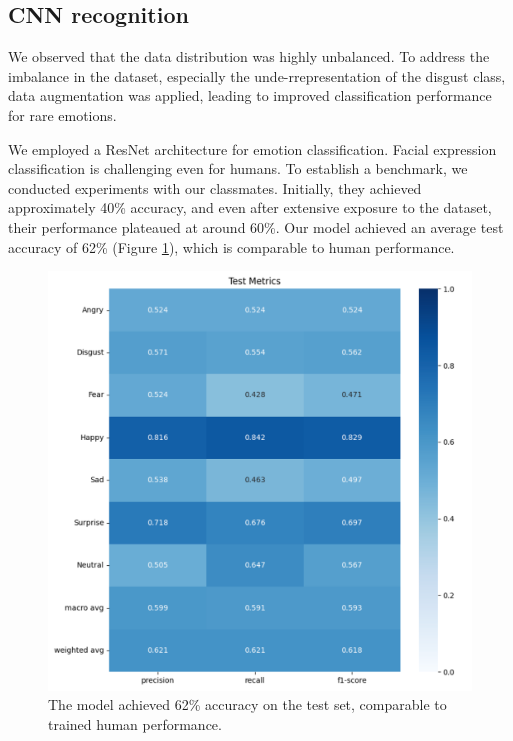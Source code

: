 \subsection{CNN recognition}
We observed that the data distribution was highly unbalanced. To address the imbalance in the dataset, especially the unde-rrepresentation of the disgust class, data augmentation was applied, leading to improved classification performance for rare emotions.

We employed a ResNet architecture for emotion classification. Facial expression classification is challenging even for humans. To establish a benchmark, we conducted experiments with our classmates. Initially, they achieved approximately 40\% accuracy, and even after extensive exposure to the dataset, their performance plateaued at around 60\%. Our model achieved an average test accuracy of 62\% (Figure \ref{fig:test_acc}), which is comparable to human performance.

\begin{figure}[!htb]
	\centering
	\includegraphics[width=0.6\linewidth]{assets/test_acc.png}
	\caption{The model achieved 62\% accuracy on the test set, comparable to trained human performance.}
	\label{fig:test_acc}
\end{figure}

